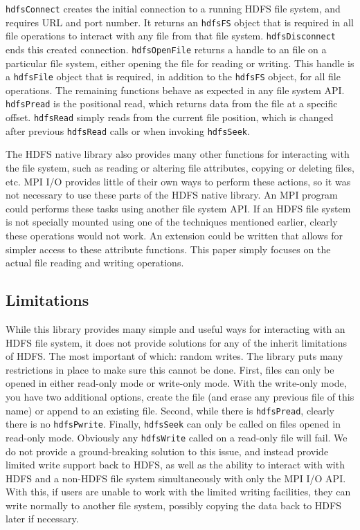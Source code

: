 \texttt{hdfsConnect} creates the initial connection to a running HDFS file system, and requires URL and port number. It returns an \texttt{hdfsFS} object that is required in all file operations to interact with any file from that file system. \texttt{hdfsDisconnect} ends this created connection. \texttt{hdfsOpenFile} returns a handle to an file on a particular file system, either opening the file for reading or writing. This handle is a \texttt{hdfsFile} object that is required, in addition to the \texttt{hdfsFS} object, for all file operations. The remaining functions behave as expected in any file system API. \texttt{hdfsPread} is the positional read, which returns data from the file at a specific offset. \texttt{hdfsRead} simply reads from the current file position, which is changed after previous \texttt{hdfsRead} calls or when invoking \texttt{hdfsSeek}.

The HDFS native library also provides many other functions for interacting with the file system, such as reading or altering file attributes, copying or deleting files, etc. MPI I/O provides little of their own ways to perform these actions, so it was not necessary to use these parts of the HDFS native library. An MPI program could performs these tasks using another file system API. If an HDFS file system is not specially mounted using one of the techniques mentioned earlier, clearly these operations would not work. An extension could be written that allows for simpler access to these attribute functions. This paper simply focuses on the actual file reading and writing operations.

\subsection{Limitations}
While this library provides many simple and useful ways for interacting with an HDFS file system, it does not provide solutions for any of the inherit limitations of HDFS. The most important of which: random writes. The library puts many restrictions in place to make sure this cannot be done. First, files can only be opened in either read-only mode or write-only mode. With the write-only mode, you have two additional options, create the file (and erase any previous file of this name) or append to an existing file. Second, while there is \texttt{hdfsPread}, clearly there is no \texttt{hdfsPwrite}. Finally, \texttt{hdfsSeek} can only be called on files opened in read-only mode. Obviously any \texttt{hdfsWrite} called on a read-only file will fail. We do not provide a ground-breaking solution to this issue, and instead provide limited write support back to HDFS, as well as the ability to interact with with HDFS and a non-HDFS file system simultaneously with only the MPI I/O API. With this, if users are unable to work with the limited writing facilities, they can write normally to another file system, possibly copying the data back to HDFS later if necessary.

